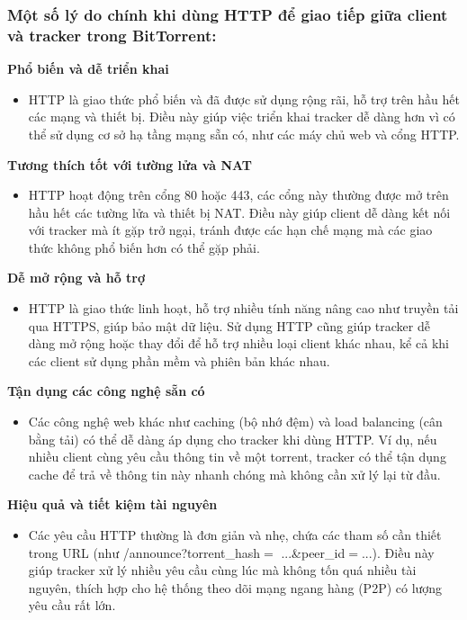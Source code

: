 \documentclass[a4paper]{article}
\begin{document}
\subsubsection{Một số lý do chính khi dùng HTTP để giao tiếp giữa client và tracker trong BitTorrent:}
\textbf{Phổ biến và dễ triển khai}
\begin{itemize}
    \item HTTP là giao thức phổ biến và đã được sử dụng rộng rãi, hỗ trợ trên hầu hết các mạng và thiết bị. Điều này giúp việc triển khai tracker dễ dàng hơn vì có thể sử dụng cơ sở hạ tầng mạng sẵn có, như các máy chủ web và cổng HTTP.
\end{itemize}

\textbf{Tương thích tốt với tường lửa và NAT}
\begin{itemize}
    \item HTTP hoạt động trên cổng 80 hoặc 443, các cổng này thường được mở trên hầu hết các tường lửa và thiết bị NAT. Điều này giúp client dễ dàng kết nối với tracker mà ít gặp trở ngại, tránh được các hạn chế mạng mà các giao thức không phổ biến hơn có thể gặp phải.
\end{itemize}

\textbf{Dễ mở rộng và hỗ trợ}
\begin{itemize}
    \item HTTP là giao thức linh hoạt, hỗ trợ nhiều tính năng nâng cao như truyền tải qua HTTPS, giúp bảo mật dữ liệu. Sử dụng HTTP cũng giúp tracker dễ dàng mở rộng hoặc thay đổi để hỗ trợ nhiều loại client khác nhau, kể cả khi các client sử dụng phần mềm và phiên bản khác nhau.
\end{itemize}

\textbf{Tận dụng các công nghệ sẵn có}
\begin{itemize}
    \item Các công nghệ web khác như caching (bộ nhớ đệm) và load balancing (cân bằng tải) có thể dễ dàng áp dụng cho tracker khi dùng HTTP. Ví dụ, nếu nhiều client cùng yêu cầu thông tin về một torrent, tracker có thể tận dụng cache để trả về thông tin này nhanh chóng mà không cần xử lý lại từ đầu.
\end{itemize}

\textbf{Hiệu quả và tiết kiệm tài nguyên}
\begin{itemize}
    \item Các yêu cầu HTTP thường là đơn giản và nhẹ, chứa các tham số cần thiết trong URL (như /announce?torrent\_hash$=$ ...\&peer\_id$=$...). Điều này giúp tracker xử lý nhiều yêu cầu cùng lúc mà không tốn quá nhiều tài nguyên, thích hợp cho hệ thống theo dõi mạng ngang hàng (P2P) có lượng yêu cầu rất lớn.
\end{itemize}
\end{document}
